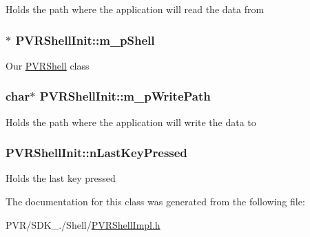 Holds the path where the application will read the data from \hypertarget{class_p_v_r_shell_init_aa389ae762133234a0cb9b6c6c832d6f7}{
\subsubsection[{m\+\_\+p\+Shell}]{$\ast$ P\+V\+R\+Shell\+Init\+::m\+\_\+p\+Shell}}\label{class_p_v_r_shell_init_aa389ae762133234a0cb9b6c6c832d6f7}
Our \hyperlink{class_p_v_r_shell}{P\+V\+R\+Shell} class \hypertarget{class_p_v_r_shell_init_a93274d3437ec846765cb0257218909de}{
\subsubsection[{m\+\_\+p\+Write\+Path}]{\setlength{\rightskip}{0pt plus 5cm}char$\ast$ P\+V\+R\+Shell\+Init\+::m\+\_\+p\+Write\+Path}}\label{class_p_v_r_shell_init_a93274d3437ec846765cb0257218909de}
Holds the path where the application will write the data to \hypertarget{class_p_v_r_shell_init_a5cc91fe74513ac587058d5f796d6f921}{
\subsubsection[{n\+Last\+Key\+Pressed}]{ P\+V\+R\+Shell\+Init\+::n\+Last\+Key\+Pressed}}\label{class_p_v_r_shell_init_a5cc91fe74513ac587058d5f796d6f921}
Holds the last key pressed 

The documentation for this class was generated from the following file\+:\begin{DoxyCompactItemize}
\item 
P\+V\+R/\+S\+D\+K\+\_./\+Shell/\hyperlink{_p_v_r_shell_impl_8h}{P\+V\+R\+Shell\+Impl.\+h}\end{DoxyCompactItemize}

